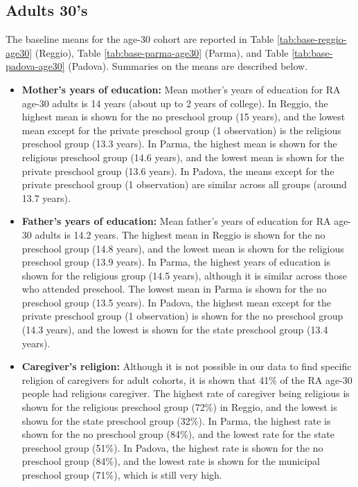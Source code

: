 \documentclass[12pt]{article}
\begin{document}
\subsection{Adults 30's}

The baseline means for the age-30 cohort are reported in Table \ref{tab:base-reggio-age30} (Reggio), Table \ref{tab:base-parma-age30} (Parma), and Table \ref{tab:base-padova-age30} (Padova). Summaries on the means are described below.

\begin{itemize}
\item \textbf{Mother's years of education:} Mean mother's years of education for RA age-30 adults is 14 years (about up to 2 years of college). In Reggio, the highest mean is shown for the no preschool group (15 years), and the lowest mean except for the private preschool group (1 observation) is the religious preschool group (13.3 years). In Parma, the highest mean is shown for the religious preschool group (14.6 years), and the lowest mean is shown for the private preschool group (13.6 years). In Padova, the means except for the private preschool group (1 observation) are similar across all groups (around 13.7 years). 

\item \textbf{Father's years of education:} Mean father's years of education for RA age-30 adults is 14.2 years. The highest mean in Reggio is shown for the no preschool group (14.8 years), and the lowest mean is shown for the religious preschool group (13.9 years). In Parma, the highest years of education is shown for the religious group (14.5 years), although it is similar across those who attended preschool. The lowest mean in Parma is shown for the no preschool group (13.5 years). In Padova, the highest mean except for the private preschool group (1 observation) is shown for the no preschool group (14.3 years), and the lowest is shown for the state preschool group (13.4 years). 

\item \textbf{Caregiver's religion:} Although it is not possible in our data to find specific religion of caregivers for adult cohorts, it is shown that 41\% of the RA age-30 people had religious caregiver. The highest rate of caregiver being religious is shown for the religious preschool group (72\%) in Reggio, and the lowest is shown for the state preschool group (32\%). In Parma, the highest rate is shown for the no preschool group (84\%), and the lowest rate for the state preschool group (51\%). In Padova, the highest rate is shown for the no preschool group (84\%), and the lowest rate is shown for the municipal preschool group (71\%), which is still very high. 
\end{itemize}
\end{document}

